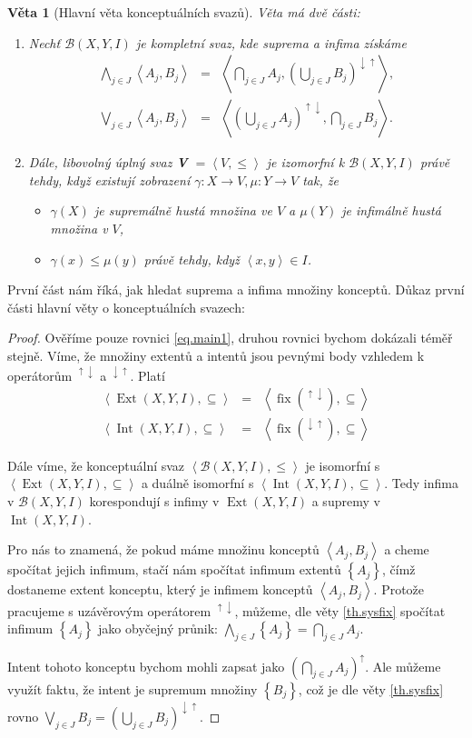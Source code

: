 \documentclass[12pt]{article}
\newcommand{\addk}[1]{\left(#1\right)}
\newcommand{\adds}[1]{\left\{#1\right\}}
\newcommand{\addsp}[1]{\left<#1\right>}
\DeclareMathOperator{\fix}{fix}
\DeclareMathOperator{\ext}{Ext}
\DeclareMathOperator{\intfca}{Int}
\newcommand{\lattice}{\mathcal{B}(X, Y, I)}
\newcommand{\up}{^{\uparrow}}
\newcommand{\updown}{^{\uparrow\downarrow}}
\newcommand{\downup}{^{\downarrow\uparrow}}
\newcommand{\biginf}{\bigwedge}
\newcommand{\bigsup}{\bigvee}
\newtheorem{theorem}{Věta}
\begin{document}
\begin{theorem}[Hlavní věta konceptuálních svazů]
Věta má dvě části:
\begin{enumerate}
	\item Nechť $\lattice$ je kompletní svaz, kde suprema a infima získáme
	\begin{eqnarray}
	\biginf_{j\in J}\addsp{A_j, B_j}&=&\addsp{\bigcap_{j\in J}A_j, \addk{\bigcup_{j\in J}B_j}\downup},\label{eq.main1}\\
	\bigsup_{j\in J}\addsp{A_j, B_j}&=&\addsp{\addk{\bigcup_{j\in J}A_j}\updown,\bigcap_{j\in J}B_j}.
	\end{eqnarray}
	\item Dále, libovolný úplný svaz \textbf{V} $=\addsp{V,\le}$ je izomorfní k $\lattice$ právě tehdy, když existují zobrazení $\gamma: X\rightarrow V, \mu:Y\rightarrow V$ tak, že
	\begin{itemize}
		\item $\gamma(X)$ je supremálně hustá množina ve $V$ a $\mu(Y)$ je infimálně hustá množina v $V$,
		\item $\gamma(x)\le\mu(y)$ právě tehdy, když $\addsp{x,y}\in I$.
	\end{itemize}
\end{enumerate}
\end{theorem}

První část nám říká, jak hledat suprema a infima množiny konceptů. Důkaz první části hlavní věty o konceptuálních svazech:

\begin{proof}
Ověříme pouze rovnici \ref{eq.main1}, druhou rovnici bychom dokázali téměř stejně. Víme, že množiny extentů a intentů jsou pevnými body vzhledem k operátorům $\updown$ a $\downup$. Platí
\begin{eqnarray}
\addsp{\ext(X,Y,I), \subseteq}&=&\addsp{\fix(\updown),\subseteq}\\
\addsp{\intfca(X,Y,I), \subseteq}&=&\addsp{\fix(\downup),\subseteq}
\end{eqnarray}

Dále víme, že konceptuální svaz $\addsp{\lattice, \le}$ je isomorfní s $\addsp{\ext(X,Y,I), \subseteq}$ a duálně isomorfní s $\addsp{\intfca(X,Y,I), \subseteq}$. Tedy infima v $\lattice$ korespondují s infimy v $\ext(X,Y,I)$ a supremy v $\intfca(X,Y,I)$. 

Pro nás to znamená, že pokud máme množinu konceptů $\addsp{A_j, B_j}$ a cheme spočítat jejich infimum, stačí nám spočítat infimum extentů $\adds{A_j}$, čímž dostaneme extent konceptu, který je infimem konceptů $\addsp{A_j, B_j}$. Protože pracujeme s uzávěrovým operátorem $\updown$, můžeme, dle věty \ref{th.sysfix} spočítat infimum $\adds{A_j}$ jako obyčejný průnik: $\biginf_{j\in J}\adds{A_j}=\bigcap_{j\in J}A_j$. 

Intent tohoto konceptu bychom mohli zapsat jako $(\bigcap_{j\in J}A_j)\up$. Ale můžeme využít faktu, že intent je supremum množiny $\adds{B_j}$, což je dle věty \ref{th.sysfix} rovno $\bigsup_{j\in J}B_j=(\bigcup_{j\in J}B_j)\downup$.
\end{proof}
\end{document}
